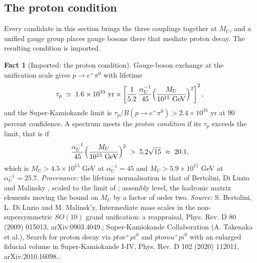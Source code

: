 \documentclass[11pt]{article}
\theoremstyle{definition}
\newtheorem{fact}[theorem]{Fact}
\theoremstyle{plain}
\begin{document}
\subsection*{The proton condition}
\label{c:note.standard-model.setting-proton-condition}
Every candidate in this section brings the three couplings together at $M_{U}$, and a unified gauge group places gauge bosons there that mediate proton decay. The resulting condition is imported.

\begin{fact}[Imported: the proton condition]\label{c:standard-model.imported-proton-condition}
Gauge-boson exchange at the unification scale gives $p \to e^{+}\pi^{0}$ with lifetime
\[
\tau_{p} \;\simeq\; 1.6 \times 10^{33}\ \text{yr} \times \left[\frac{1}{5.2}\,\frac{\alpha_{U}^{-1}}{45}\Bigl(\frac{M_{U}}{10^{15}\ \text{GeV}}\Bigr)^{2}\right]^{2},
\]
and the Super-Kamiokande limit is $\tau_{p}/B(p \to e^{+}\pi^{0}) > 2.4 \times 10^{34}$ yr at $90$ percent confidence. A spectrum meets the \emph{proton condition} if its $\tau_{p}$ exceeds the limit, that is if
\[
\frac{\alpha_{U}^{-1}}{45}\Bigl(\frac{M_{U}}{10^{15}\ \text{GeV}}\Bigr)^{2} \;>\; 5.2\sqrt{15} \;\approx\; 20.1,
\]
which is $M_{U} > 4.5 \times 10^{15}$ GeV at $\alpha_{U}^{-1} = 45$ and $M_{U} > 5.9 \times 10^{15}$ GeV at $\alpha_{U}^{-1} = 25.7$. \emph{Provenance:} the lifetime normalisation is that of Bertolini, Di Luzio and Malinsky \cite{BertoliniDiLuzioMalinsky2009}, scaled to the limit of \cite{SuperK2020}; assembly level, the hadronic matrix elements moving the bound on $M_{U}$ by a factor of order two.
\emph{Source:} S. Bertolini, L. Di Luzio and M. Malinsk'y, Intermediate mass scales in the non-supersymmetric $SO(10)$ grand unification: a reappraisal, Phys. Rev. D 80 (2009) 015013, arXiv:0903.4049.; Super-Kamiokande Collaboration (A. Takenaka et al.), Search for proton decay via $p to e^+pi^0$ and $p to mu^+pi^0$ with an enlarged fiducial volume in Super-Kamiokande I-IV, Phys. Rev. D 102 (2020) 112011, arXiv:2010.16098..
\end{fact}
\end{document}
